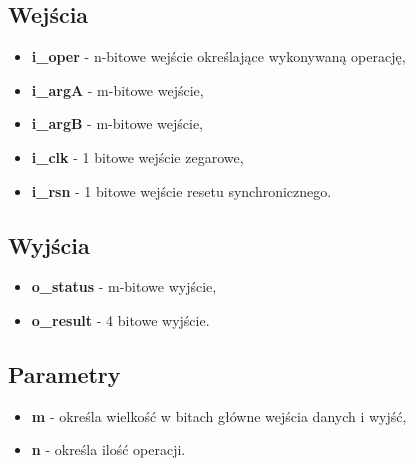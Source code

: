 \subsection{Wejścia}
\begin{itemize}
	\item \textbf{i\_oper} - n-bitowe wejście określające wykonywaną operację,
	\item \textbf{i\_argA} - m-bitowe wejście,
	\item \textbf{i\_argB} - m-bitowe wejście,
	\item \textbf{i\_clk} - 1 bitowe wejście zegarowe,
	\item \textbf{i\_rsn} - 1 bitowe wejście resetu synchronicznego.
\end{itemize}

\subsection{Wyjścia}
\begin{itemize}
	\item \textbf{o\_status} - m-bitowe wyjście,
	\item \textbf{o\_result} - 4 bitowe wyjście.
\end{itemize}

\subsection{Parametry}
\begin{itemize}
	\item \textbf{m} - określa wielkość w bitach główne wejścia danych i wyjść,
	\item \textbf{n} - określa ilość operacji.
\end{itemize}